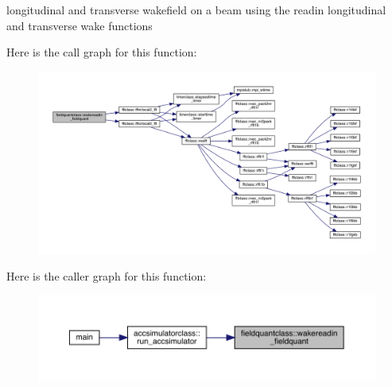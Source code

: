 longitudinal and transverse wakefield on a beam using the readin longitudinal and transverse wake functions 

Here is the call graph for this function\+:\nopagebreak
\begin{figure}[H]
\begin{center}
\leavevmode
\includegraphics[width=350pt]{namespacefieldquantclass_afc918d38222797f1f06903259e48461b_cgraph}
\end{center}
\end{figure}
Here is the caller graph for this function\+:\nopagebreak
\begin{figure}[H]
\begin{center}
\leavevmode
\includegraphics[width=350pt]{namespacefieldquantclass_afc918d38222797f1f06903259e48461b_icgraph}
\end{center}
\end{figure}
